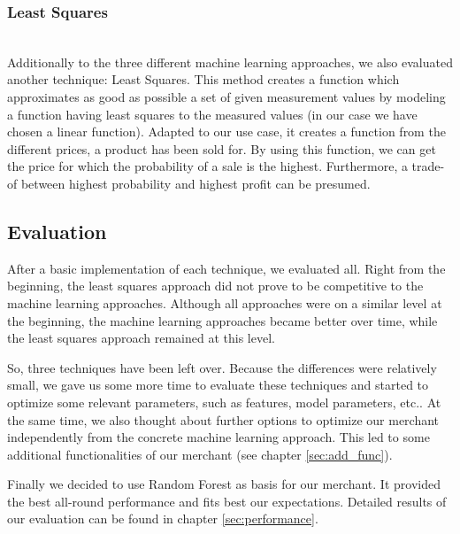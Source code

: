 \subsubsection{Least Squares}
	~\\
	Additionally to the three different machine learning approaches, we also evaluated another technique: Least Squares. This method creates a function which approximates as good as possible a set of given measurement values by modeling a function having least squares to the measured values (in our case we have chosen a linear function). Adapted to our use case, it creates a function from the different prices, a product has been sold for. By using this function, we can get the price for which the probability of a sale is the highest. Furthermore, a trade-of between highest probability and highest profit can be presumed.
\subsection{Evaluation}
\label{sec:model_eval}
	After a basic implementation of each technique, we evaluated all. Right from the beginning, the least squares approach did not prove to be competitive to the machine learning approaches. Although all approaches were on a similar level at the beginning, the machine learning approaches became better over time, while the least squares approach remained at this level.

	So, three techniques have been left over. Because the differences were relatively small, we gave us some more time to evaluate these techniques and started to optimize some relevant parameters, such as features, model parameters, etc.. At the same time, we also thought about further options to optimize our merchant independently from the concrete machine learning approach. This led to some additional functionalities of our merchant (see chapter \ref{sec:add_func}).

    Finally we decided to use Random Forest as basis for our merchant. It provided the best all-round performance and fits best our expectations. Detailed results of our evaluation can be found in chapter \ref{sec:performance}.
